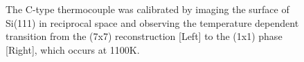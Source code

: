 \begin{figure}
  \hfill
  \caption{
  The C-type thermocouple was calibrated by imaging the surface of Si(111) in reciprocal space and observing the temperature dependent transition from the (7x7) reconstruction [Left] to the (1x1) phase [Right], which occurs at 1100K.
  }
  \label{fig:Si(111)}
\end{figure}

